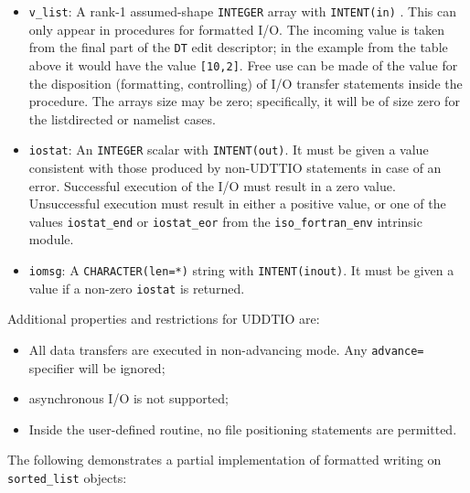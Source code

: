 \documentclass[]{scrartcl}
\providecommand{\tightlist}{%
  \setlength{\itemsep}{0pt}\setlength{\parskip}{0pt}}
\begin{document}
\begin{itemize}
\tightlist
\item
  \texttt{v\_list}: A rank-1 assumed-shape \texttt{INTEGER} array with
  \texttt{INTENT(in)} . This can only appear in procedures for formatted
  I/O. The incoming value is taken from the final part of the
  \texttt{DT} edit descriptor; in the example from the table above it
  would have the value \texttt{{[}10,2{]}}. Free use can be made of the
  value for the disposition (formatting, controlling) of I/O transfer
  statements inside the procedure. The array\textquotesingle s size may
  be zero; specifically, it will be of size zero for the listdirected or
  namelist cases.
\item
  \texttt{iostat}: An \texttt{INTEGER} scalar with \texttt{INTENT(out)}.
  It must be given a value consistent with those produced by non-UDTTIO
  statements in case of an error. Successful execution of the I/O must
  result in a zero value. Unsuccessful execution must result in either a
  positive value, or one of the values \texttt{iostat\_end} or
  \texttt{iostat\_eor} from the \texttt{iso\_fortran\_env} intrinsic
  module.
\item
  \texttt{iomsg}: A \texttt{CHARACTER(len=*)} string with
  \texttt{INTENT(inout)}. It must be given a value if a non-zero
  \texttt{iostat} is returned.
\end{itemize}

Additional properties and restrictions for UDDTIO are:

\begin{itemize}
\tightlist
\item
  All data transfers are executed in non-advancing mode. Any
  \texttt{advance=} specifier will be ignored;
\item
  asynchronous I/O is not supported;
\item
  Inside the user-defined routine, no file positioning statements are
  permitted.
\end{itemize}

The following demonstrates a partial implementation of formatted writing
on \texttt{sorted\_list} objects:
\end{document}

